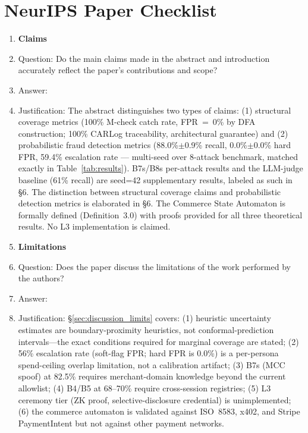 \section*{NeurIPS Paper Checklist}

\begin{enumerate}

\item {\bf Claims}
    \item[] Question: Do the main claims made in the abstract and introduction accurately reflect the paper's contributions and scope?
    \item[] Answer: \answerYes{}
    \item[] Justification: The abstract distinguishes two types of claims: (1) structural coverage metrics (100\% M-check catch rate, FPR~=~0\% by DFA construction; 100\% CARLog traceability, architectural guarantee) and (2) probabilistic fraud detection metrics (88.0\%$\pm$0.9\% recall, 0.0\%$\pm$0.0\% hard FPR, 59.4\% escalation rate --- multi-seed over 8-attack benchmark, matched exactly in Table~\ref{tab:results}). B7s/B8s per-attack results and the LLM-judge baseline (61\% recall) are seed=42 supplementary results, labeled as such in \S6. The distinction between structural coverage claims and probabilistic detection metrics is elaborated in \S6. The Commerce State Automaton is formally defined (Definition~3.0) with proofs provided for all three theoretical results. No L3 implementation is claimed.

\item {\bf Limitations}
    \item[] Question: Does the paper discuss the limitations of the work performed by the authors?
    \item[] Answer: \answerYes{}
    \item[] Justification: \S\ref{sec:discussion_limits} covers: (1) heuristic uncertainty estimates are boundary-proximity heuristics, not conformal-prediction intervals---the exact conditions required for marginal coverage are stated; (2) 56\% escalation rate (soft-flag FPR; hard FPR is 0.0\%) is a per-persona spend-ceiling overlap limitation, not a calibration artifact; (3) B7s (MCC spoof) at 82.5\% requires merchant-domain knowledge beyond the current allowlist; (4) B4/B5 at 68--70\% require cross-session registries; (5) L3 ceremony tier (ZK proof, selective-disclosure credential) is unimplemented; (6) the commerce automaton is validated against ISO~8583, x402, and Stripe PaymentIntent but not against other payment networks.


\end{enumerate}
